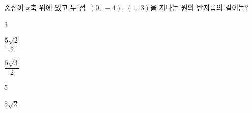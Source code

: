 중심이 $x$축 위에 있고 두 점~$(0,\,-4)$, $(1,\,3)$을 지나는 원의 반지름의 길이는?
\begin{choices32}{\rule[-3ex]{0pt}{8ex}$3$}{\rule[-3ex]{0pt}{8ex}$\dfrac{5\sqrt{2}}{2}$}{\rule[-3ex]{0pt}{8ex}$\dfrac{5\sqrt{3}}{2}$}{\rule[-3ex]{0pt}{8ex}$5$}{\rule[-3ex]{0pt}{8ex}$5\sqrt{2}$}\end{choices32}
